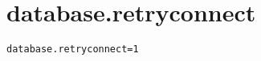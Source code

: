 \section{database.retryconnect}
\label{configuration:DatabaseRetryconnect}
\AvailableInJavaOnly{\TODO}
\begin{lstlisting}[style=Props,caption={Usage example for \textit{database.retryconnect}}]
database.retryconnect=1
\end{lstlisting}